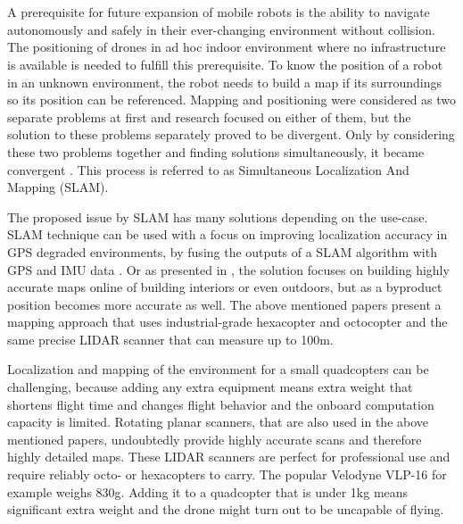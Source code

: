 \chapter{\bevezetes}





A prerequisite for future expansion of mobile robots is the ability to navigate autonomously and safely in their ever-changing
environment without collision. The positioning of drones in ad hoc indoor environment where no infrastructure is available is 
needed to fulfill this prerequisite. To know the position of a robot in an unknown environment, the robot needs to build a map
if its surroundings so its position can be referenced. Mapping and positioning were considered as two separate problems 
at first and research focused on either of them, but the solution to these problems separately proved to be divergent. Only 
by considering these two problems together and finding solutions simultaneously, it became convergent 
\cite{durrant2006simultaneous}. This process is referred to as Simultaneous Localization And Mapping (SLAM).

The proposed issue by SLAM has many solutions depending on the use-case. SLAM technique can be used with a 
focus on improving localization accuracy in GPS degraded environments, by fusing the outputs of a SLAM algorithm with GPS and
IMU data \cite{hening20173d}. Or as presented in \cite{droeschel2018efficient}, the solution focuses on building highly accurate maps
online of building interiors or even outdoors, but as a byproduct position becomes more accurate as well. The above mentioned 
papers present a mapping approach that uses industrial-grade hexacopter and octocopter and the same precise LIDAR scanner that can
measure up to 100m. 

Localization and mapping of the environment for a small quadcopters can be challenging, because adding any extra equipment means
extra weight that shortens flight time and changes flight behavior and the onboard computation capacity is limited. Rotating planar 
scanners, that are also used in the above mentioned papers, undoubtedly provide highly accurate scans and therefore highly detailed maps.
These LIDAR scanners are perfect for professional use and require reliably octo- or hexacopters to carry. 
The popular Velodyne VLP-16 for example weighs 830g. Adding it to a quadcopter that is under 1kg means significant extra weight and the 
drone might turn out to be uncapable of flying. 

